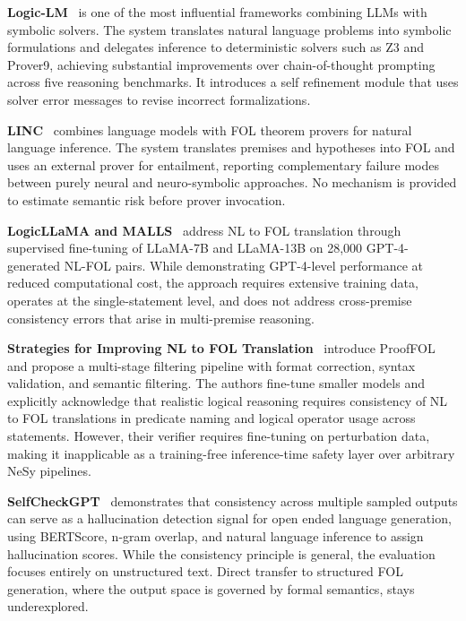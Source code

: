 \textbf{Logic-LM}~\cite{pan2023logiclm} is one of the most influential frameworks combining LLMs with symbolic solvers. The system translates natural language problems into symbolic formulations and delegates inference to deterministic solvers such as Z3 and Prover9, achieving substantial improvements over chain-of-thought prompting across five reasoning benchmarks. It introduces a self refinement module that uses solver error messages to revise incorrect formalizations. 

\textbf{LINC}~\cite{olausson2023linc} combines language models with FOL theorem provers for natural language inference. The system translates premises and hypotheses into FOL and uses an external prover for entailment, reporting complementary failure modes between purely neural and neuro-symbolic approaches. No mechanism is provided to estimate semantic risk before prover invocation.

\textbf{LogicLLaMA and MALLS}~\cite{yang2024harnessing} address NL to FOL translation through supervised fine-tuning of LLaMA-7B and LLaMA-13B on 28,000 GPT-4-generated NL-FOL pairs. While demonstrating GPT-4-level performance at reduced computational cost, the approach requires extensive training data, operates at the single-statement level, and does not address cross-premise consistency errors that arise in multi-premise reasoning.

\textbf{Strategies for Improving NL to FOL Translation}~\cite{thatikonda2024strategies} introduce ProofFOL and propose a multi-stage filtering pipeline with format correction, syntax validation, and semantic filtering. The authors fine-tune smaller models and explicitly acknowledge that realistic logical reasoning requires consistency of NL to FOL translations in predicate naming and logical operator usage across statements. However, their verifier requires fine-tuning on perturbation data, making it inapplicable as a training-free inference-time safety layer over arbitrary NeSy pipelines.

\textbf{SelfCheckGPT}~\cite{manakul2023selfcheck} demonstrates that consistency across multiple sampled outputs can serve as a hallucination detection signal for open ended language generation, using BERTScore, n-gram overlap, and natural language inference to assign hallucination scores. While the consistency principle is general, the evaluation focuses entirely on unstructured text. Direct transfer to structured FOL generation, where the output space is governed by formal semantics, stays underexplored.

